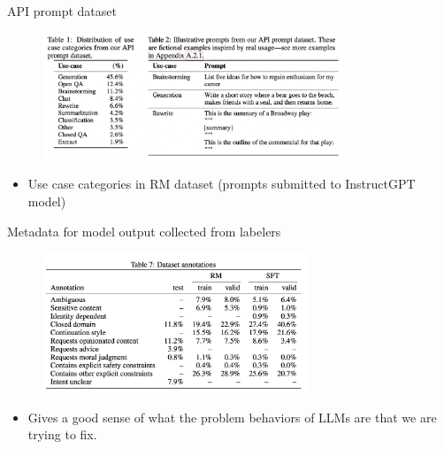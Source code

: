 \begin{vbframe}{API prompt dataset}

\vfill

\begin{figure}
\centering
\includegraphics[width = 9cm]{figure/apipromptdataset.png}
\end{figure}

\begin{itemize}
	\item Use case categories in RM dataset
        (prompts  submitted to
        InstructGPT model)
\end{itemize}



\vfill

\end{vbframe}


\begin{vbframe}{Metadata for model output collected from labelers}

\vfill

\begin{figure}
\centering
\includegraphics[width = 8cm]{figure/instructgpttable3b.png}
\end{figure}

\begin{itemize}
	\item Gives a good sense of what the problem
	behaviors of LLMs are
	that we are trying to fix.
\end{itemize}

\vfill

\end{vbframe}

